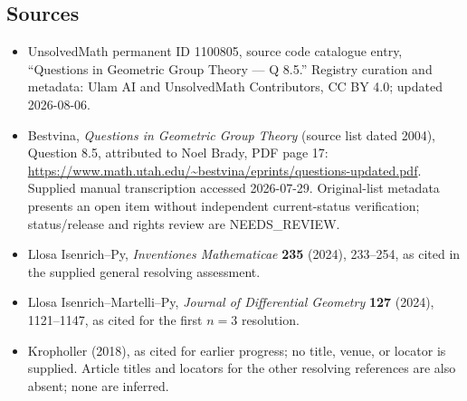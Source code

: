 \documentclass[11pt]{article}
\begin{document}
\subsection{Sources}
\begin{itemize}
\item UnsolvedMath permanent ID 1100805, source code catalogue entry, ``Questions in Geometric Group Theory --- Q 8.5.'' Registry curation and metadata: Ulam AI and UnsolvedMath Contributors, CC BY 4.0; updated 2026-08-06.
\item Bestvina, \emph{Questions in Geometric Group Theory} (source list dated 2004), Question 8.5, attributed to Noel Brady, PDF page 17: \url{https://www.math.utah.edu/~bestvina/eprints/questions-updated.pdf}. Supplied manual transcription accessed 2026-07-29. Original-list metadata presents an open item without independent current-status verification; status/release and rights review are NEEDS\_REVIEW.
\item Llosa Isenrich--Py, \emph{Inventiones Mathematicae} \textbf{235} (2024), 233--254, as cited in the supplied general resolving assessment.
\item Llosa Isenrich--Martelli--Py, \emph{Journal of Differential Geometry} \textbf{127} (2024), 1121--1147, as cited for the first $n=3$ resolution.
\item Kropholler (2018), as cited for earlier progress; no title, venue, or locator is supplied. Article titles and locators for the other resolving references are also absent; none are inferred.
\end{itemize}
\end{document}
